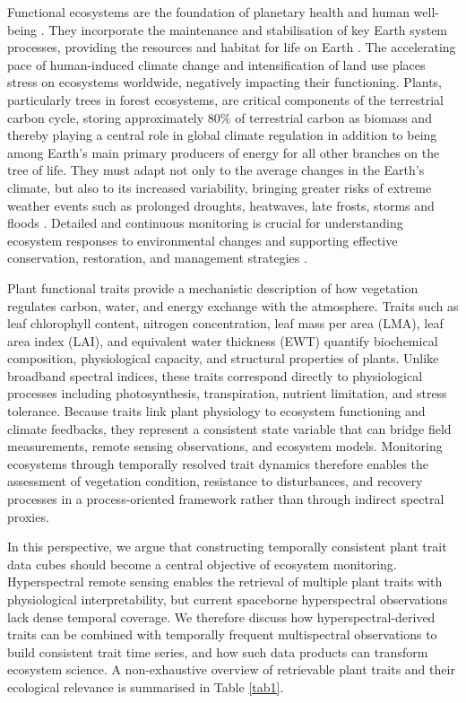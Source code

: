 \documentclass[pdflatex,sn-mathphys-num]{sn-jnl}%
\theoremstyle{thmstyleone}%
\theoremstyle{thmstyletwo}%
\theoremstyle{thmstylethree}%
\begin{document}
Functional ecosystems are the foundation of planetary health and human well-being \cite{ipbes2019,hernandez2022ecosystem}. They incorporate the maintenance and stabilisation of key Earth system processes, providing the resources and habitat for life on Earth \cite{ipcc2022wg2ch2}. The accelerating pace of human-induced climate change and intensification of land use places stress on ecosystems worldwide, negatively impacting their functioning. Plants, particularly trees in forest ecosystems, are critical components of the terrestrial carbon cycle, storing approximately 80\% of terrestrial carbon as biomass and thereby playing a central role in global climate regulation \cite{pan2011large} in addition to being among Earth's main primary producers of energy for all other branches on the tree of life. They must adapt not only to the average changes in the Earth's climate, but also to its increased variability, bringing greater risks of extreme weather events such as prolonged droughts, heatwaves, late frosts, storms and floods \cite{lindner2010climate,seidl2017}. Detailed and continuous monitoring is crucial for understanding ecosystem responses to environmental changes and supporting effective conservation, restoration, and management strategies \cite{mahecha2024biodiversity}.

Plant functional traits provide a mechanistic description of how vegetation regulates carbon, water, and energy exchange with the atmosphere. Traits such as leaf chlorophyll content, nitrogen concentration, leaf mass per area (LMA), leaf area index (LAI), and equivalent water thickness (EWT) quantify biochemical composition, physiological capacity, and structural properties of plants. Unlike broadband spectral indices, these traits correspond directly to physiological processes including photosynthesis, transpiration, nutrient limitation, and stress tolerance. Because traits link plant physiology to ecosystem functioning and climate feedbacks, they represent a consistent state variable that can bridge field measurements, remote sensing observations, and ecosystem models. Monitoring ecosystems through temporally resolved trait dynamics therefore enables the assessment of vegetation condition, resistance to disturbances, and recovery processes in a process-oriented framework rather than through indirect spectral proxies.

In this perspective, we argue that constructing temporally consistent plant trait data cubes should become a central objective of ecosystem monitoring. Hyperspectral remote sensing enables the retrieval of multiple plant traits with physiological interpretability, but current spaceborne hyperspectral observations lack dense temporal coverage. We therefore discuss how hyperspectral-derived traits can be combined with temporally frequent multispectral observations to build consistent trait time series, and how such data products can transform ecosystem science. A non-exhaustive overview of retrievable plant traits and their ecological relevance is summarised in Table \ref{tab1}.
\end{document}
